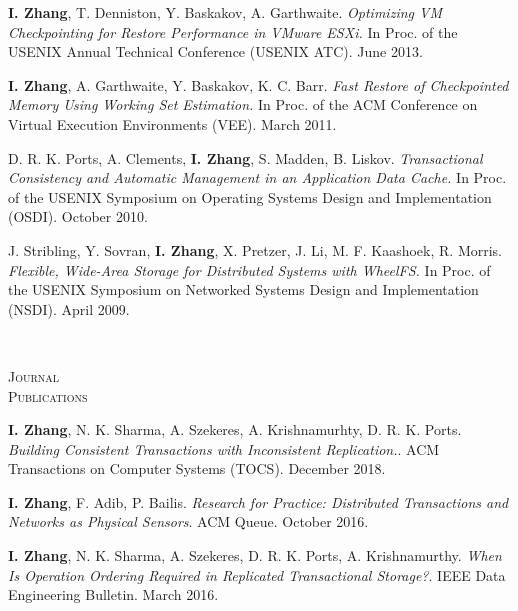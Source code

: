 \documentclass[10pt,times]{report}
\newlength{\sectiongap}
\newlength{\sectioncolwidth}
\newlength{\colgap}
\newlength{\stuffwidth}
\newenvironment{rtable}{
  \begin{minipage}{\textwidth}
  }{
  \end{minipage}
}
\newenvironment{rsection}[1]{
  \begin{minipage}[t]{\sectioncolwidth}
    \textsc{#1}
  \end{minipage}
  \hspace{\colgap}
  \begin{minipage}[t]{\stuffwidth}
  }{
    \removelastskip
  \end{minipage}
  \\[\sectiongap]
}
\begin{document}
\begin{rtable}
  \begin{rsection} {}
    \textbf{I. Zhang}, T. Denniston, Y. Baskakov, A. Garthwaite.
    \textit{Optimizing VM Checkpointing for Restore Performance in
      VMware ESXi.}  In Proc. of the USENIX Annual Technical
    Conference (USENIX ATC).  June 2013. \\\vspace{-0.5em}

    \textbf{I. Zhang}, A. Garthwaite, Y. Baskakov,
    K. C. Barr. \textit{Fast Restore of Checkpointed Memory Using
      Working Set Estimation.}  In Proc. of the ACM Conference
    on Virtual Execution Environments (VEE).  March
    2011.\\\vspace{-0.5em}

    D. R. K. Ports, A. Clements, \textbf{I. Zhang}, S. Madden,
    B. Liskov. \textit{Transactional Consistency and Automatic
      Management in an Application Data Cache.}  In Proc. of the
    USENIX Symposium on Operating Systems Design and Implementation
    (OSDI). October 2010.\\\vspace{-0.5em}

    J. Stribling, Y. Sovran, \textbf{I. Zhang}, X. Pretzer, J. Li,
    M. F. Kaashoek, R. Morris. \textit{Flexible, Wide-Area Storage for
      Distributed Systems with WheelFS.}  In Proc. of the USENIX
    Symposium on Networked Systems Design and
    Implementation (NSDI).  April 2009.
  \end{rsection}
  
  \begin{rsection}{Journal\\Publications}
    \textbf{I. Zhang}, N. K. Sharma, A. Szekeres, A. Krishnamurhty,
    D. R. K. Ports. \textit{Building Consistent Transactions with
      Inconsistent Replication.}.  ACM Transactions on Computer
    Systems (TOCS). December 2018. \\\vspace{-0.5em}

    \textbf{I. Zhang}, F. Adib, P. Bailis. \textit{Research for
      Practice: Distributed Transactions and Networks as Physical
      Sensors}. ACM Queue. October 2016.\\\vspace{-0.5em}

    \textbf{I. Zhang}, N. K. Sharma, A. Szekeres,
    D. R. K. Ports, A. Krishnamurthy. \textit{When Is Operation
      Ordering Required in Replicated Transactional Storage?}.  IEEE
    Data Engineering Bulletin. March 2016.\\\vspace{-0.5em}


\end{rsection}
\end{rtable}
\end{document}
